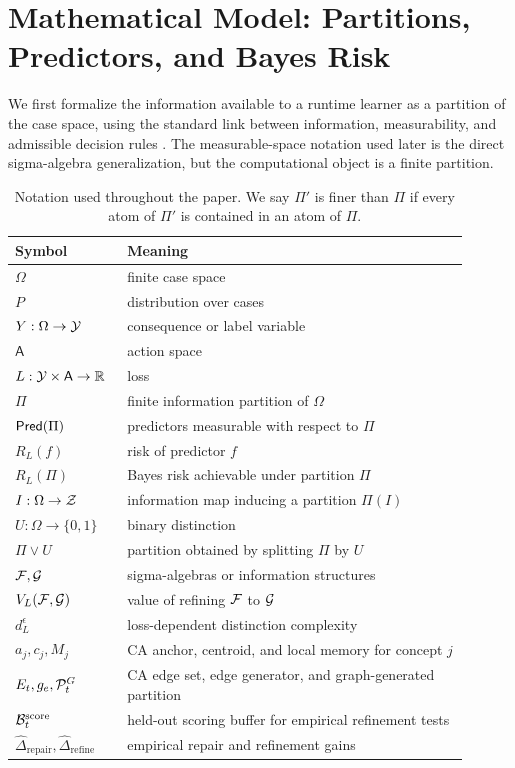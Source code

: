 \section{Mathematical Model: Partitions, Predictors, and Bayes Risk}
\label{sec:preliminaries}

We first formalize the information available to a runtime learner as a partition of the case space, using the standard link between information, measurability, and admissible decision rules \citep{blackwell1953equivalent,berger1985statistical,billingsley1995probability,kallenberg2002foundations}. The measurable-space notation used later is the direct sigma-algebra generalization, but the computational object is a finite partition.

\begin{table}[t]
\centering
\small
\begin{tabular}{>{\raggedright\arraybackslash}p{0.20\linewidth}p{0.70\linewidth}}
\toprule
Symbol & Meaning \\
\midrule
$\Omega$ & finite case space \\
$P$ & distribution over cases \\
$Y:\Omega\to\mathcal{Y}$ & consequence or label variable \\
$\mathsf A$ & action space \\
$L:\mathcal{Y}\times\mathsf A\to\mathbb{R}$ & loss \\
$\Pi$ & finite information partition of $\Omega$ \\
$\mathsf{Pred}(\Pi)$ & predictors measurable with respect to $\Pi$ \\
$R_L(f)$ & risk of predictor $f$ \\
$R_L(\Pi)$ & Bayes risk achievable under partition $\Pi$ \\
$I:\Omega\to\mathcal{Z}$ & information map inducing a partition $\Pi(I)$ \\
$U:\Omega\to\{0,1\}$ & binary distinction \\
$\Pi\vee U$ & partition obtained by splitting $\Pi$ by $U$ \\
$\mathcal{F},\mathcal{G}$ & sigma-algebras or information structures \\
$V_L(\mathcal{F},\mathcal{G})$ & value of refining $\mathcal{F}$ to $\mathcal{G}$ \\
$d_L^\epsilon$ & loss-dependent distinction complexity \\
$a_j,c_j,M_j$ & CA anchor, centroid, and local memory for concept $j$ \\
$E_t,g_e,\mathcal{P}_t^G$ & CA edge set, edge generator, and graph-generated partition \\
$\mathcal{B}_t^{\mathrm{score}}$ & held-out scoring buffer for empirical refinement tests \\
$\widehat\Delta_{\mathrm{repair}},\widehat\Delta_{\mathrm{refine}}$ & empirical repair and refinement gains \\
\bottomrule
\end{tabular}
\caption{Notation used throughout the paper. We say $\Pi'$ is finer than $\Pi$ if every atom of $\Pi'$ is contained in an atom of $\Pi$.}
\label{tab:notation}
\end{table}

